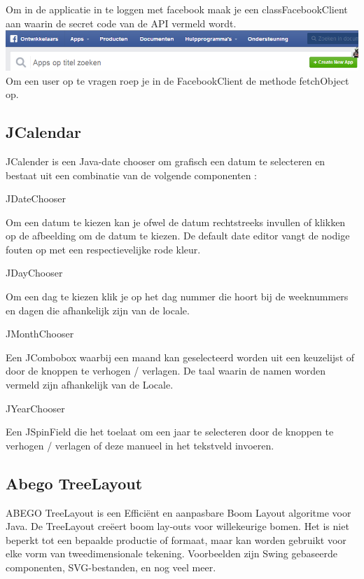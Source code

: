 \documentclass[pdftex,a4paper,12pt,twoside]{report}
\begin{document}
Om in de applicatie in te loggen met facebook maak je een classFacebookClient aan waarin de secret code van de API vermeld wordt.
\includegraphics{images/facebook4.png}\\

Om een user op te vragen roep je in de FacebookClient de methode fetchObject op.

 

\subsection{JCalendar}
JCalender is een Java-date chooser om grafisch een datum te selecteren en bestaat uit een combinatie van de volgende componenten :

JDateChooser

Om een datum te kiezen kan je ofwel de datum rechtstreeks invullen of klikken op de afbeelding om de datum te kiezen.
De default date editor vangt de nodige fouten op met een respectievelijke rode kleur.


JDayChooser

Om een dag te kiezen klik je op het dag nummer die hoort bij de weeknummers en dagen die afhankelijk zijn van de locale.



JMonthChooser

Een JCombobox  waarbij een maand kan geselecteerd worden uit een keuzelijst of door de knoppen te verhogen / verlagen. De taal waarin de namen worden vermeld zijn afhankelijk van de Locale.
 
JYearChooser

Een JSpinField die het toelaat om een jaar te selecteren door de knoppen te verhogen / verlagen of deze manueel in het tekstveld invoeren.




\subsection{Abego TreeLayout}
ABEGO TreeLayout is een Efficiënt en aanpasbare Boom Layout algoritme voor Java.
De TreeLayout creëert boom lay-outs voor willekeurige bomen. Het is niet beperkt tot een bepaalde productie of formaat, maar kan worden gebruikt voor elke vorm van tweedimensionale tekening. Voorbeelden zijn Swing gebaseerde componenten, SVG-bestanden, en nog veel meer.
\end{document}
